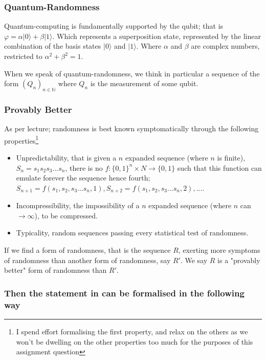 \documentclass{article}
\begin{document}
\subsubsection*{Quantum-Randomness}
Quantum-computing is fundamentally supported by the qubit; that is $\varphi = \alpha | 0\rangle + \beta | 1\rangle$. Which represents a superposition state, represented by the linear combination of the basis states $| 0\rangle$ and $| 1\rangle$. Where $\alpha$ and $\beta$ are complex numbers, restricted to $\alpha^2 + \beta^2 = 1$. 

When we speak of quantum-randomness, we think in particular a sequence of the form $(Q_n)_{n \in \mathbb{N}}$ where $Q_n$ is the measurement of some qubit.

\subsubsection*{Provably Better}
As per lecture; randomness is best known symptomatically through the following properties\footnote{I spend effort formalising the first property, and relax on the others as we won't be dwelling on the other properties too much for the purposes of this assignment question}

\begin{itemize}
	\item Unpredictability, that is given a $n$ expanded sequence (where $n$ is finite), $S_n=s_1s_2s_3...s_n$, there is no $f: \{0,1\}^n \times N \rightarrow \{0,1\}$ such that this function can emulate forever the sequence hence fourth; $S_{n+1} = f(s_1,s_2,s_3...s_n, 1), S_{n+2} = f(s_1,s_2,s_3...s_n, 2), ...$.
	\item Incompressibility, the impossibility of a $n$ expanded sequence (where $n$ can $\rightarrow \infty$), to be compressed.
	\item Typicality, random sequences passing every statistical test of randomness.
\end{itemize}

If we find a form of randomness, that is the sequence $R$, exerting more symptoms of randomness than another form of randomness, say $R'$. We say $R$ is a "provably better" form of randomness than $R'$.

\subsubsection{Then the statement in can be formalised in the following way}
\end{document}
